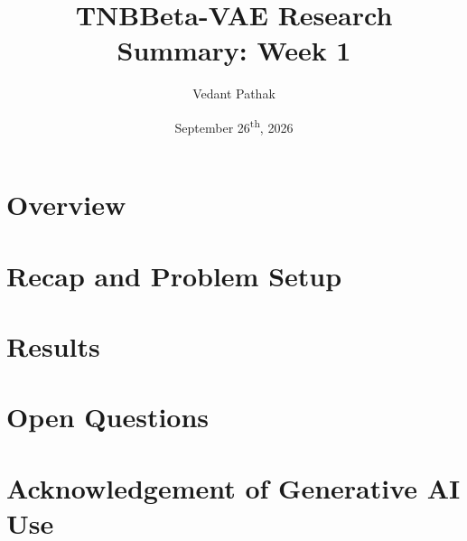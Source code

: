 \documentclass[12pt]{article}
\title{TNBBeta-VAE Research Summary: Week 1}
\author[1]{Vedant Pathak}
\affil[1]{Department of Statistics, University of Chicago}
\date{September 26\textsuperscript{th}, 2026}
\begin{document}
\maketitle

\section{Overview}


\section{Recap and Problem Setup}


\section{Results}
\label{sec:results}


\section{Open Questions}


\section*{Acknowledgement of Generative AI Use}




\end{document}
